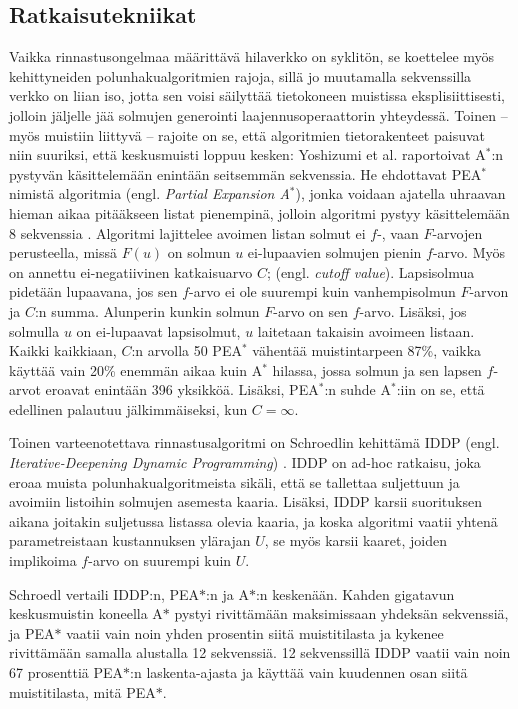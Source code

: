 \documentclass[finnish]{tktltiki2}
\theoremstyle{definition}
\theoremstyle{remark}
\begin{document}
\subsection{Ratkaisutekniikat}
Vaikka rinnastusongelmaa määrittävä hilaverkko on syklitön, se koettelee myös kehittyneiden polunhakualgoritmien rajoja, sillä jo muutamalla sekvenssilla verkko on liian iso, jotta sen voisi säilyttää tietokoneen muistissa eksplisiittisesti, jolloin jäljelle jää solmujen generointi laajennusoperaattorin yhteydessä. Toinen -- myös muistiin liittyvä -- rajoite on se, että algoritmien tietorakenteet paisuvat niin suuriksi, että keskusmuisti loppuu kesken: Yoshizumi et al. raportoivat A$^{\ast}$:n pystyvän käsittelemään enintään seitsemmän sekvenssia. He ehdottavat PEA$^{\ast}$ nimistä algoritmia (engl. \textit{Partial Expansion A}$^\ast$), jonka voidaan ajatella uhraavan hieman aikaa pitääkseen listat pienempinä, jolloin algoritmi pystyy käsittelemään 8 sekvenssia \cite{Yoshizumi00}. Algoritmi lajittelee avoimen listan solmut ei $f$-, vaan $F$-arvojen perusteella, missä $F(u)$ on solmun $u$ ei-lupaavien solmujen pienin $f$-arvo. Myös on annettu ei-negatiivinen katkaisuarvo $C$; (engl. \textit{cutoff value}). Lapsisolmua pidetään lupaavana, jos sen $f$-arvo ei ole suurempi kuin vanhempisolmun $F$-arvon ja $C$:n summa. Alunperin kunkin solmun $F$-arvo on sen $f$-arvo. Lisäksi, jos solmulla $u$ on ei-lupaavat lapsisolmut, $u$ laitetaan takaisin avoimeen listaan. Kaikki kaikkiaan, $C$:n arvolla 50 PEA$^{\ast}$ vähentää muistintarpeen 87\%, vaikka käyttää vain 20\% enemmän aikaa kuin A$^{\ast}$ hilassa, jossa solmun ja sen lapsen $f$-arvot eroavat enintään 396 yksikköä. Lisäksi, PEA$^{\ast}$:n suhde A$^{\ast}$:iin on se, että edellinen palautuu jälkimmäiseksi, kun $C = \infty$.

Toinen varteenotettava rinnastusalgoritmi on Schroedlin kehittämä IDDP (engl. \textit{Iterative-Deepening Dynamic Programming}) \cite{Schroedl05}. IDDP on ad-hoc ratkaisu, joka eroaa muista polunhakualgoritmeista sikäli, että se tallettaa suljettuun ja avoimiin listoihin solmujen asemesta kaaria. Lisäksi, IDDP karsii suorituksen aikana joitakin suljetussa listassa olevia kaaria, ja koska algoritmi vaatii yhtenä parametreistaan kustannuksen ylärajan $U$, se myös karsii kaaret, joiden implikoima $f$-arvo on suurempi kuin $U$.

Schroedl vertaili IDDP:n, PEA$\ast$:n ja A$\ast$:n keskenään. Kahden gigatavun keskusmuistin koneella A$\ast$ pystyi rivittämään maksimissaan yhdeksän sekvenssiä, ja PEA$\ast$ vaatii vain noin yhden prosentin siitä muistitilasta ja kykenee rivittämään samalla alustalla 12 sekvenssiä. 12 sekvenssillä IDDP vaatii vain noin 67 prosenttiä PEA$\ast$:n laskenta-ajasta ja käyttää vain kuudennen osan siitä muistitilasta, mitä PEA$\ast$.
\end{document}
